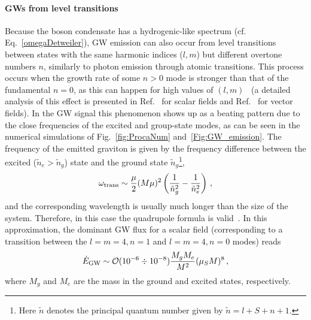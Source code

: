 \documentclass[11pt]{article}
\numberwithin{equation}{section} %
\begin{document}
\paragraph{GWs from level transitions}
Because the boson condensate has a hydrogenic-like spectrum (cf. Eq.~\eqref{omegaDetweiler}), GW emission can also occur from level transitions between states with the same harmonic indices ($l,m$) but different overtone numbers $n$, similarly to photon emission through atomic transitions. 
This process occurs when the growth rate of some $n>0$ mode is stronger than that of the fundamental $n=0$, as this can happen for high values of $(l,m)$~\cite{Arvanitaki:2009fg,Arvanitaki:2010sy,Arvanitaki:2014wva,Siemonsen:2019ebd} (a detailed analysis of this effect is presented in Ref.~\cite{Yoshino:2015nsa} for scalar fields and Ref.~\cite{Siemonsen:2019ebd} for vector fields). In the GW signal this phenomenon shows up as a beating pattern due to the close frequencies of the excited and group-state modes, as can be seen in the numerical simulations of Fig.~\ref{fig:ProcaNum} and~\ref{Fig:GW_emission}.
The frequency of the emitted graviton is given by the frequency difference between the excited ($\tilde{n}_e>\tilde{n}_g$) state and the ground state $\tilde{n}_g$\footnote{Here $\tilde{n}$ denotes the principal quantum number given by $\tilde{n}=l+S+n+1$.},
\begin{equation}
 \omega_{\rm trans}\sim\frac{\mu}{2}(M \mu)^2\left(\frac{1}{\tilde{n}_g^2}-\frac{1}{\tilde{n}_e^2}\right)\,,
\end{equation}
and the corresponding wavelength is usually much longer than the size of the system. Therefore, in this case the quadrupole formula is valid~\cite{Arvanitaki:2010sy}. 
%
In this approximation, the dominant GW flux for a scalar field (corresponding to a transition between the $l=m=4,n=1$ and $l=m=4,n=0$ modes) reads~\cite{Arvanitaki:2010sy,Arvanitaki:2014wva}
\begin{equation}
\dot{E}_{\rm GW}\sim {\cal O}(10^{-6} \div 10^{-8})\frac{M_gM_e}{M^2}(\mu_S M)^8\,,
\end{equation}
where $M_g$ and $M_e$ are the mass in the ground and excited states, respectively.
\end{document}
